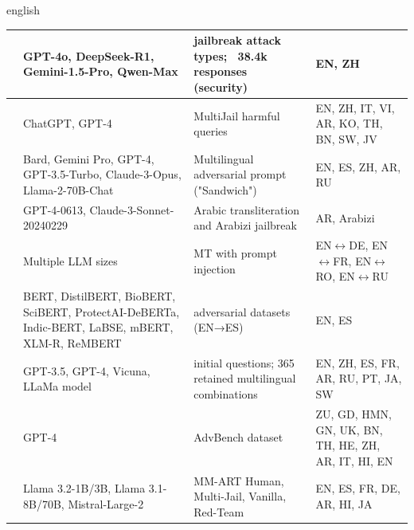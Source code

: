 \begin{otherlanguage*}{english}
\begin{landscape}
\begin{table}[h]
\begin{tabularx}{\linewidth}{>{\RaggedRight}p{4cm}|>{\RaggedRight}p{7.5cm}|>{\RaggedRight}p{7.5cm}|>{\arraybackslash}X}
\multicolumn{4}{p{\dimexpr\textwidth-2\tabcolsep\relax}}{\fonte{Author.}}
\endlastfoot
\textcite{huangTowerBabelRevisited2025} & GPT-4o, DeepSeek-R1, Gemini-1.5-Pro, Qwen-Max & 32 jailbreak attack types; ~38.4k responses (security) & EN, ZH \\ \hline
\textcite{dengMultilingualJailbreakChallenges2024} & ChatGPT, GPT-4 & MultiJail harmful queries & EN, ZH, IT, VI, AR, KO, TH, BN, SW, JV \\ \hline
\textcite{upadhayaySandwichAttackMultilanguage2024} & Bard, Gemini Pro, GPT-4, GPT-3.5-Turbo, Claude-3-Opus, Llama-2-70B-Chat & Multilingual adversarial prompt ("Sandwich") & EN, ES, ZH, AR, RU \\ \hline
\textcite{ghanimJailbreakingLLMsArabic2024} & GPT-4-0613, Claude-3-Sonnet-20240229 & Arabic transliteration and Arabizi jailbreak & AR, Arabizi \\ \hline
\textcite{sunScalingBehaviorMachine2024a} & Multiple LLM sizes & MT with prompt injection & EN$\leftrightarrow$DE, EN$\leftrightarrow$FR, EN$\leftrightarrow$RO, EN$\leftrightarrow$RU \\ \hline
\textcite{abbasiMultilingualPromptInjection2025} & BERT, DistilBERT, BioBERT, SciBERT, ProtectAI-DeBERTa, Indic-BERT, LaBSE, mBERT, XLM-R, ReMBERT & 4 adversarial datasets (EN→ES) & EN, ES \\ \hline
\textcite{liCrossLanguageInvestigationJailbreak2024} & GPT-3.5, GPT-4, Vicuna, LLaMa model & 745 initial questions; 365 retained multilingual combinations & EN, ZH, ES, FR, AR, RU, PT, JA, SW \\ \hline
\textcite{yongLowResourceLanguagesJailbreak2023} & GPT-4 & AdvBench dataset & ZU, GD, HMN, GN, UK, BN, TH, HE, ZH, AR, IT, HI, EN \\ \hline
\textcite{singhaniaMultilingualMultiturnAutomated2025} & Llama 3.2-1B/3B, Llama 3.1-8B/70B, Mistral-Large-2 & MM-ART Human, Multi-Jail, Vanilla, Red-Team & EN, ES, FR, DE, AR, HI, JA \\ \hline
\end{tabularx}
\par{}


\end{table}




\end{landscape}
\end{otherlanguage*}
